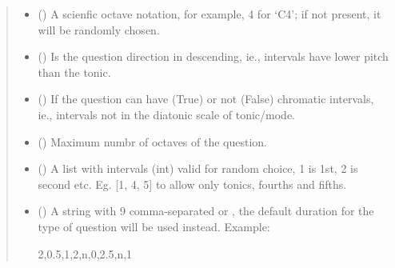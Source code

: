 \documentclass[letterpaper,10pt,english]{sphinxmanual}
\begin{document}
\begin{fulllineitems}
\begin{fulllineitems}
\begin{quote}
\begin{description}
\begin{itemize}
\item {} 
 () \textendash{} A scienfic octave notation, for example,
4 for ‘C4’; if not present, it will be randomly chosen.

\item {} 
 () \textendash{} Is the question direction in descending,
ie., intervals have lower pitch than the tonic.

\item {} 
 () \textendash{} If the question can have (True) or not
(False) chromatic intervals, ie., intervals not in the
diatonic scale of tonic/mode.

\item {} 
 () \textendash{} Maximum numbr of octaves of the question.

\item {} 
 () \textendash{} A list with intervals (int) valid for
random choice, 1 is 1st, 2 is second etc. Eg. {[}1, 4, 5{]} to
allow only tonics, fourths and fifths.

\item {} 
 () \textendash{} 
A string with 9 comma-separated  or
, the
default duration for the type of question will be used instead.
Example:

\begin{sphinxVerbatim}[commandchars=\\\{\}]
\PYGZdq{}2,0.5,1,2,n,0,2.5,n,1\PYGZdq{}
\end{sphinxVerbatim}



\end{itemize}
\end{description}
\end{quote}
\end{fulllineitems}
\end{fulllineitems}
\end{document}
